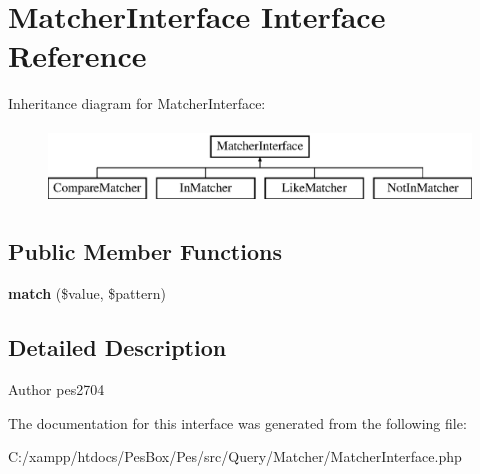 \hypertarget{interface_pes_1_1_query_1_1_matcher_1_1_matcher_interface}{}\section{Matcher\+Interface Interface Reference}
\label{interface_pes_1_1_query_1_1_matcher_1_1_matcher_interface}
Inheritance diagram for Matcher\+Interface\+:\begin{figure}[H]
\begin{center}
\leavevmode
\includegraphics[height=2.000000cm]{interface_pes_1_1_query_1_1_matcher_1_1_matcher_interface}
\end{center}
\end{figure}
\subsection*{Public Member Functions}
\begin{DoxyCompactItemize}
\item 
\mbox{\label{interface_pes_1_1_query_1_1_matcher_1_1_matcher_interface_af38750109828e091458dbb0481a2a0d7}} 
{\bfseries match} (\$value, \$pattern)
\end{DoxyCompactItemize}


\subsection{Detailed Description}
\begin{DoxyAuthor}{Author}
pes2704 
\end{DoxyAuthor}


The documentation for this interface was generated from the following file\+:\begin{DoxyCompactItemize}
\item 
C\+:/xampp/htdocs/\+Pes\+Box/\+Pes/src/\+Query/\+Matcher/Matcher\+Interface.\+php\end{DoxyCompactItemize}
